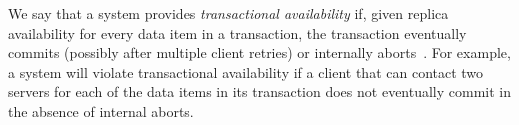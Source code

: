 We say that a system provides \textit{transactional availability} if,
given replica availability for every data item in a transaction, the
transaction eventually commits (possibly after multiple client
retries) or internally aborts~\cite{hat-hotos}. For example, a system
will violate transactional availability if a client that can contact
two servers for each of the data items in its transaction does not
eventually commit in the absence of internal aborts.


